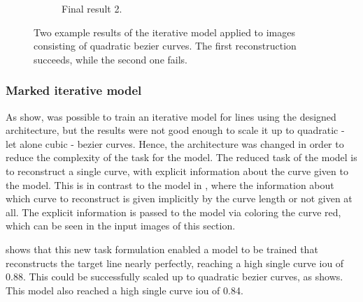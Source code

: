 \begin{figure}
\begin{subfigure}{.2\textwidth}
        \caption{Final result 2.}
    \end{subfigure}
    \caption{Two example results of the iterative model applied to images consisting of quadratic bezier curves. The first reconstruction succeeds, while the second one fails.}
    \label{fig:iterative.3.recons}
\end{figure}

\subsubsection{Marked iterative model}

As  show, was possible to train an iterative model for lines using the designed architecture, but the results were not good enough to scale it up to quadratic - let alone cubic - bezier curves. Hence, the architecture was changed in order to reduce the complexity of the task for the model. The reduced task of the model is to reconstruct a single curve, with explicit information about the curve given to the model. This is in contrast to the model in , where the information about which curve to reconstruct is given implicitly by the curve length or not given at all. The explicit information is passed to the model via coloring the curve red, which can be seen in the input images of this section.

 shows that this new task formulation enabled a model to be trained that reconstructs the target line nearly perfectly, reaching a high single curve \gls{iou} of 0.88. This could be successfully scaled up to quadratic bezier curves, as  shows. This model also reached a high single curve \gls{iou} of 0.84.

